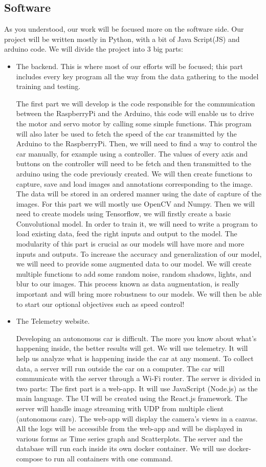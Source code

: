 \documentclass[12pt]{article}
\begin{document}
\subsection{Software}
As you understood, our work will be focused more on the software side.
Our project will be written mostly in Python, with a bit of Java Script(JS) and arduino code.
We will divide the project into 3 big parts:
\begin{itemize}
\item The backend. This is where most of our efforts will be focused; this part includes every key program all the way from the data gathering to the model training and testing.

The first part we will develop is the code responsible for the communication between the RaspberryPi and the Arduino, this code will enable us to drive the motor and servo motor by calling some simple functions. This program will also later be used to fetch the speed of the car transmitted by the Arduino to the RaspberryPi.
Then, we will need to find a way to control the car manually, for example using a controller. The values of every axis and buttons on the controller will need to be fetch and then transmitted to the arduino using the code previously created.
We will then create functions to capture, save and load images and annotations corresponding to the image. The data will be stored in an ordered manner using the date of capture of the images. For this part we will mostly use OpenCV and Numpy.
Then we will need to create models using Tensorflow, we will firstly create a basic Convolutional model. In order to train it, we will need to write a program to load existing data, feed the right inputs and output to the model. The modularity of this part is crucial as our models will have more and more inputs and outputs.
To increase the accuracy and generalization of our model, we will need to provide some augmented data to our model. We will create multiple functions to add some random noise, random shadows, lights, and blur to our images. This process known as data augmentation, is really important and will bring more robustness to our models.
We will then be able to start our optional objectives such as speed control!

\item The Telemetry website.

Developing an autonomous car is difficult. The more you know about what’s happening inside, the better results will get. We will use telemetry. It will help us analyze what is happening inside the car at any moment. To collect data, a server will run outside the car on a computer. The car will communicate with the server through a Wi-Fi router. The server is divided in two parts: The first part is a web-app. It will use JavaScript (Node.js) as the main language. The UI will be created using the React.js framework. The server will handle image streaming with UDP from multiple client (autonomous cars). The web-app will display the camera’s views in a canvas. All the logs will be accessible from the web-app and will be displayed in various forms as Time series graph and Scatterplots. The server and the database will run each inside its own docker container. We will use docker-compose to run all containers with one command.


\end{itemize}
\end{document}
